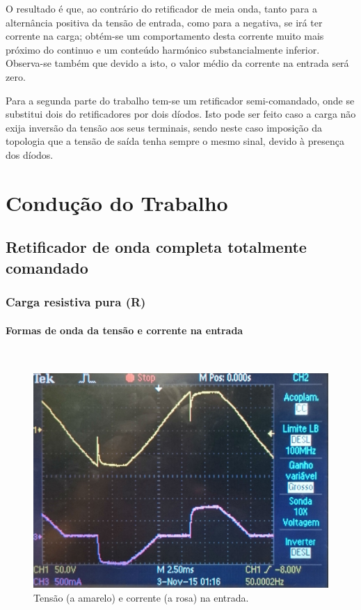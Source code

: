 \documentclass[a4paper,11pt]{article}
\numberwithin{equation}{section}
\begin{document}
O resultado é que, ao contrário do retificador de meia onda, tanto para a alternância positiva da tensão de entrada, como para a negativa, se irá ter corrente na carga; obtém-se um comportamento desta corrente muito mais próximo do continuo e um conteúdo harmónico substancialmente inferior. Observa-se também que devido a isto, o valor médio da corrente na entrada será zero.

Para a segunda parte do trabalho tem-se um retificador semi-comandado, onde se substitui dois do retificadores por dois díodos. Isto pode ser feito caso a carga não exija inversão da tensão aos seus terminais, sendo neste caso imposição da topologia que a tensão de saída tenha sempre o mesmo sinal, devido à presença dos díodos.


\section{Condução do Trabalho}

\subsection{Retificador de onda completa totalmente comandado}


\subsubsection{Carga resistiva pura (R)}


\paragraph{Formas de onda da tensão e corrente na entrada} \mbox{}\

\begin{figure}[H]
	\centering
	\includegraphics[keepaspectratio=true, scale=0.12]{img/DSC_0181}
	\caption{Tensão (a amarelo) e corrente (a rosa) na entrada.}
	\label{fig:tcentrada}
	\vspace{-0.8em}
\end{figure}
\end{document}
